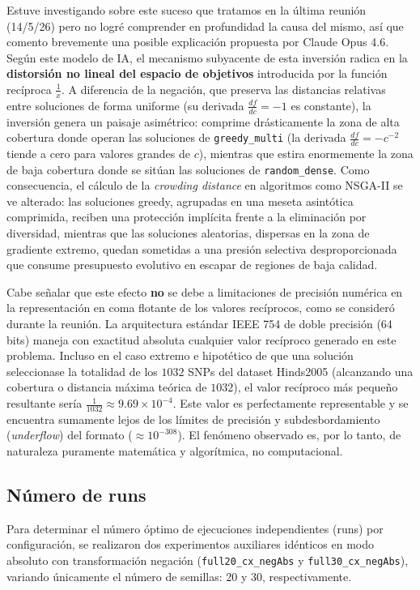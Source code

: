 \documentclass[a4paper,10pt]{article}
\begin{document}
Estuve investigando sobre este suceso que tratamos en la última reunión (14/5/26) pero no logré comprender en profundidad la causa del mismo, así que comento brevemente una posible explicación propuesta por Claude Opus 4.6. Según este modelo de IA, el mecanismo subyacente de esta inversión radica en la \textbf{distorsión no lineal del espacio de objetivos} introducida por la función recíproca $\frac{1}{x}$. A diferencia de la negación, que preserva las distancias relativas entre soluciones de forma uniforme (su derivada $\frac{df}{dc} = -1$ es constante), la inversión genera un paisaje asimétrico: comprime drásticamente la zona de alta cobertura donde operan las soluciones de \texttt{greedy\_multi} (la derivada $\frac{df}{dc} = -c^{-2}$ tiende a cero para valores grandes de $c$), mientras que estira enormemente la zona de baja cobertura donde se sitúan las soluciones de \texttt{random\_dense}. Como consecuencia, el cálculo de la \textit{crowding distance} en algoritmos como NSGA-II se ve alterado: las soluciones greedy, agrupadas en una meseta asintótica comprimida, reciben una protección implícita frente a la eliminación por diversidad, mientras que las soluciones aleatorias, dispersas en la zona de gradiente extremo, quedan sometidas a una presión selectiva desproporcionada que consume presupuesto evolutivo en escapar de regiones de baja calidad.

Cabe señalar que este efecto \textbf{no} se debe a limitaciones de precisión numérica en la representación en coma flotante de los valores recíprocos, como se consideró durante la reunión. La arquitectura estándar IEEE 754 de doble precisión (64 bits) maneja con exactitud absoluta cualquier valor recíproco generado en este problema. Incluso en el caso extremo e hipotético de que una solución seleccionase la totalidad de los $1032$ SNPs del dataset Hinds2005 (alcanzando una cobertura o distancia máxima teórica de $1032$), el valor recíproco más pequeño resultante sería $\frac{1}{1032} \approx 9.69 \times 10^{-4}$. Este valor es perfectamente representable y se encuentra sumamente lejos de los límites de precisión y subdesbordamiento (\textit{underflow}) del formato ($\approx 10^{-308}$). El fenómeno observado es, por lo tanto, de naturaleza puramente matemática y algorítmica, no computacional.


\subsection{Número de runs}

Para determinar el número óptimo de ejecuciones independientes (runs) por configuración, se realizaron dos experimentos auxiliares idénticos en modo absoluto con transformación negación (\texttt{full20\_cx\_negAbs} y \texttt{full30\_cx\_negAbs}), variando únicamente el número de semillas: 20 y 30, respectivamente.
\end{document}
